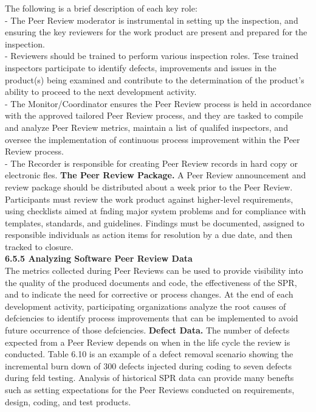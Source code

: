 \documentclass[twocolumn,a4paper,13pt]{book}
\begin{document}
The following is a brief description of each key role:\\
- The Peer Review moderator is instrumental in setting up the inspection, and ensuring the key reviewers
for the work product are present and prepared for the
inspection.\\
- Reviewers should be trained to perform various inspection roles. Tese trained inspectors participate to identify defects, improvements and issues in the product(s)
being examined and contribute to the determination
of the product’s ability to proceed to the next development activity.\\
- The Monitor/Coordinator ensures the Peer Review
process is held in accordance with the approved tailored Peer Review process, and they are tasked to compile and analyze Peer Review metrics, maintain a list of
qualifed inspectors, and oversee the implementation
of continuous process improvement within the Peer
Review process.\\
- The Recorder is responsible for creating Peer Review
records in hard copy or electronic fles.
\textbf{The Peer Review Package.} A Peer Review announcement and review package should be distributed about a week
prior to the Peer Review. Participants must review the work
product against higher-level requirements, using checklists
aimed at fnding major system problems and for compliance with templates, standards, and guidelines. Findings
must be documented, assigned to responsible individuals as
action items for resolution by a due date, and then tracked
to closure.\\
\textbf{6.5.5 Analyzing Software Peer Review Data}\\
The metrics collected during Peer Reviews can be used to
provide visibility into the quality of the produced documents
and code, the eﬀectiveness of the SPR, and to indicate the
need for corrective or process changes. At the end of each
development activity, participating organizations analyze the
root causes of defciencies to identify process improvements
that can be implemented to avoid future occurrence of those
defciencies.
\textbf{Defect Data.} The number of defects expected from a
Peer Review depends on when in the life cycle the review
is conducted. Table 6.10 is an example of a defect removal
scenario showing the incremental burn down of 300
defects injected during coding to seven defects during feld
testing.
Analysis of historical SPR data can provide many benefts such as setting expectations for the Peer Reviews conducted on requirements, design, coding, and test products.
\end{document}
